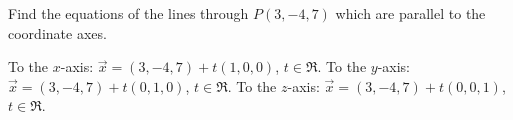 
\begin{Exercise}[
name={},
title={}, 
difficulty=0,
origin={\cite{SM}}]
Find the equations of the lines through $P(3,-4,7)$ which are parallel to the coordinate axes.
\end{Exercise}

\begin{Answer}
To the $x$-axis: $\vec{x} = (3,-4,7) + t(1,0,0)$, $t\in\Re$. To the $y$-axis: $\vec{x} = (3,-4,7) + t(0,1,0)$, $t\in\Re$. To the $z$-axis: $\vec{x} = (3,-4,7) + t(0,0,1)$, $t\in\Re$.
\end{Answer}
